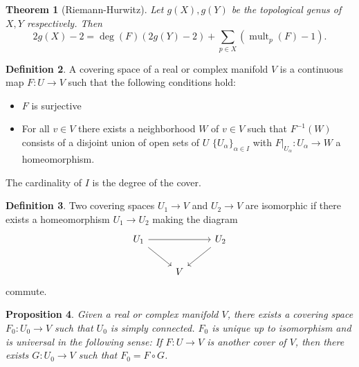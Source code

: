 \documentclass{dcthesis}
\newcommand{\defi}[1]{\textsf{#1}}
\DeclareMathOperator{\mult}{mult}
\newtheorem{prop}{Proposition}[section]
\newtheorem{theorem}[prop]{Theorem}
\theoremstyle{definition}
\newtheorem{definition}[prop]{Definition}
\theoremstyle{remark}
\numberwithin{equation}{section}
\numberwithin{figure}{section}
\begin{document}
{{\begin{theorem}[Riemann-Hurwitz]
      Let $g(X), g(Y)$ be the topological genus
      of $X, Y$ respectively.
      Then
      \begin{equation}
        \label{eqn:riemannhurwitzforriemannsurfaces}
        2g(X)-2=
        \deg(F)(2g(Y)-2)+
        \sum_{p\in X}(\mult_p(F)-1).
      \end{equation}
    \end{theorem}
    \begin{definition}
      \label{def:coveringspace}
      A \defi{covering space}
      of a real or complex manifold $V$
      is a continuous map
      $F\colon U\to V$ such that
      the following conditions hold:
      \begin{itemize}
        \item
          $F$ is surjective
        \item
          For all $v\in V$
          there exists a neighborhood
          $W$ of $v\in V$ such that
          $F^{-1}(W)$ consists of a disjoint
          union of open sets of $U$
          $\{U_\alpha\}_{\alpha\in I}$
          with $F|_{U_\alpha}\colon U_\alpha\to W$
          a homeomorphism.
      \end{itemize}
      The cardinality of $I$ is the \defi{degree}
      of the cover.
    \end{definition}
    \begin{definition}
      \label{def:coveringspaceiso}
      Two covering spaces $U_1\to V$
      and $U_2\to V$ are
      \defi{isomorphic}
      if there exists a homeomorphism
      $U_1\to U_2$
      making the diagram
      \begin{equation}
        \label{eqn:coveringspaceiso}
        \begin{tikzcd}
          U_1\arrow{dr}\arrow{rr}{}&&U_2\arrow{dl}\\
                         &V
        \end{tikzcd}
      \end{equation}
      commute.
    \end{definition}
    \begin{prop}
      \label{prop:universalcoveringspace}
      Given a real or complex manifold $V$,
      there exists a covering space
      $F_0\colon U_0\to V$
      such that $U_0$ is simply connected.
      $F_0$ is unique up to isomorphism
      and is universal in the following sense:
      If $F\colon U\to V$ is another cover of $V$,
      then there exists
      $G\colon U_0\to V$
      such that $F_0 = F\circ G$.

\end{prop}}}
\end{document}
